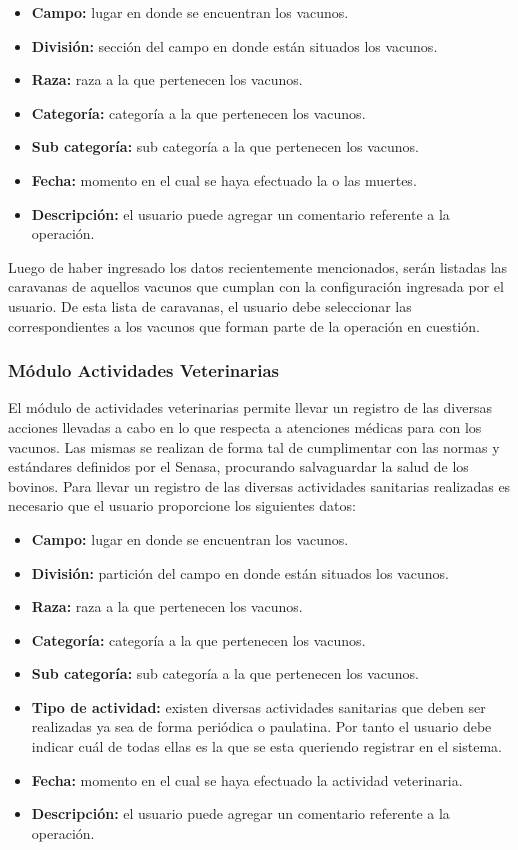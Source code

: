 \documentclass[11pt,oneside]{book}
\begin{document}
\begin{itemize}
\item \textbf{Campo:} lugar en donde se encuentran los vacunos.
\item \textbf{División:} sección del campo en donde están situados los vacunos.
\item \textbf{Raza:} raza a la que pertenecen los vacunos.
\item \textbf{Categoría:} categoría a la que pertenecen los vacunos. 
\item \textbf{Sub categoría:} sub categoría a la que pertenecen los vacunos.
\item \textbf{Fecha:} momento en el cual se haya efectuado la o las muertes.
\item \textbf{Descripción:} el usuario puede agregar un comentario referente a la operación.
\end{itemize}

Luego de haber ingresado los datos recientemente mencionados, serán listadas las caravanas de aquellos vacunos que cumplan con la configuración ingresada por el usuario. De esta lista de caravanas, el usuario debe seleccionar las correspondientes a los vacunos que forman parte de la operación en cuestión.

\newpage
\subsubsection{Módulo Actividades Veterinarias}
El módulo de actividades veterinarias permite llevar un registro de las diversas acciones llevadas a cabo en lo que respecta a atenciones médicas para con los vacunos. Las mismas se realizan de forma tal de cumplimentar con las normas y estándares definidos por el Senasa, procurando salvaguardar la salud de los bovinos. Para llevar un registro de las diversas actividades sanitarias realizadas es necesario que el usuario proporcione los siguientes datos:
\begin{itemize}
\item \textbf{Campo:} lugar en donde se encuentran los vacunos.
\item \textbf{División:} partición del campo en donde están situados los vacunos.
\item \textbf{Raza:} raza a la que pertenecen los vacunos.
\item \textbf{Categoría:} categoría a la que pertenecen los vacunos. 
\item \textbf{Sub categoría:} sub categoría a la que pertenecen los vacunos.
\item \textbf{Tipo de actividad:} existen diversas actividades sanitarias que deben ser realizadas ya sea de forma periódica o paulatina. Por tanto el usuario debe indicar cuál de todas ellas es la que se esta queriendo registrar en el sistema.
\item \textbf{Fecha:} momento en el cual se haya efectuado la actividad veterinaria.
\item \textbf{Descripción:} el usuario puede agregar un comentario referente a la operación.
\end{itemize}
\end{document}
